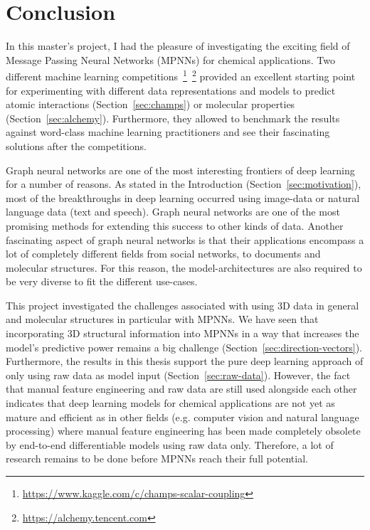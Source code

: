 \chapter{Conclusion}
\label{chapter:Conclusion}

In this master's project, I had the pleasure of investigating the exciting field of Message Passing Neural Networks (MPNNs) for chemical applications. Two different machine learning competitions~\footnote{\url{https://www.kaggle.com/c/champs-scalar-coupling}}~\footnote{\url{https://alchemy.tencent.com}} provided an excellent starting point for experimenting with different data representations and models to predict atomic interactions (Section~\ref{sec:champs}) or molecular properties (Section~\ref{sec:alchemy}). Furthermore, they allowed to benchmark the results against word-class machine learning practitioners and see their fascinating solutions after the competitions.

Graph neural networks are one of the most interesting frontiers of deep learning for a number of reasons. As stated in the Introduction (Section~\ref{sec:motivation}), most of the breakthroughs in deep learning occurred using image-data or natural language data (text and speech). Graph neural networks are one of the most promising methods for extending this success to other kinds of data. Another fascinating aspect of graph neural networks is that their applications encompass a lot of completely different fields from social networks, to documents and molecular structures. For this reason, the model-architectures are also required to be very diverse to fit the different use-cases.

This project investigated the challenges associated with using 3D data in general and molecular structures in particular with MPNNs. We have seen that incorporating 3D structural information into MPNNs in a way that increases the model's predictive power remains a big challenge (Section~\ref{sec:direction-vectors}). Furthermore, the results in this thesis support the pure deep learning approach of only using raw data as model input (Section~\ref{sec:raw-data}). However, the fact that manual feature engineering and raw data are still used alongside each other indicates that deep learning models for chemical applications are not yet as mature and efficient as in other fields (e.g. computer vision and natural language processing) where manual feature engineering has been made completely obsolete by end-to-end differentiable models using raw data only. Therefore, a lot of research remains to be done before MPNNs reach their full potential.

